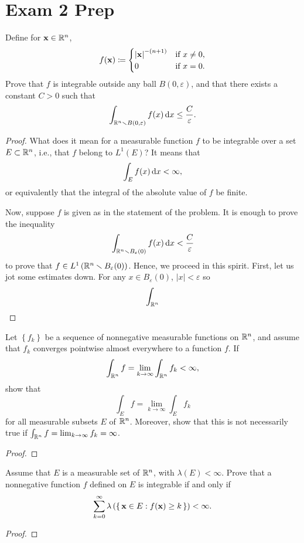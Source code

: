 \section{Exam 2 Prep}
\begin{problem}
Define for $\mathbf{x}\in\mathbb{R}^n$,
\[
f(\mathbf{x})\coloneqq
\begin{cases}
\left|\mathbf{x}\right|^{-(n+1)}&\text{if $x\neq 0$,}\\
0&\text{if $x=0$.}
\end{cases}
\]
Prove that $f$ is integrable outside any ball $B(0,\varepsilon)$, and that
there exists a constant $C>0$ such that
\[
\int_{\mathbb{R}^n\smallsetminus B(0,\varepsilon)}f(x)\mathop{}\!\mathrm{d} x\leq\frac{C}{\varepsilon}.
\]
\end{problem}
\begin{proof}
What does it mean for a measurable function $f$ to be integrable over a set
$E\subset\mathbb{R}^n$, i.e., that $f$ belong to $L^1(E)$? It means that
\[
\int_E f(x)\mathop{}\!\mathrm{d} x<\infty,
\]
or equivalently that the integral of the absolute value of $f$ be
finite.

Now, suppose $f$ is given as in the statement of the problem. It is enough
to prove the inequality
\begin{equation}
  \label{eq:given-inequality-1}
\int_{\mathbb{R}^n\smallsetminus B_\varepsilon(0)} f(x)\mathop{}\!\mathrm{d} x<\frac{C}{\varepsilon}
\end{equation}
to prove that $f\in L^1\left(\mathbb{R}^n\smallsetminus B_\varepsilon(0)\right)$. Hence,
we proceed in this spirit. First, let us jot some estimates down. For any
$x\in B_\varepsilon(0)$, $|x|<\varepsilon$ so
\[
\int_{\mathbb{R}^n}
\]
\end{proof}

\begin{problem}
Let $\left\{f_k\right\}$ be a sequence of nonnegative measurable functions
on $\mathbb{R}^n$, and assume that $f_k$ converges pointwise almost everywhere to
a function $f$. If
\[
\int_{\mathbb{R}^n} f=\lim_{k\to\infty}\int_{\mathbb{R}^n} f_k<\infty,
\]
show that
\[
\int_E f=\lim_{k\to\infty}\int_E f_k
\]
for all measurable subsets $E$ of $\mathbb{R}^n$. Moreover, show that this is not
necessarily true if $\int_{\mathbb{R}^n} f=\lim_{k\to\infty} f_k=\infty$.
\end{problem}
\begin{proof}
\end{proof}

\begin{problem}
Assume that $E$ is a measurable set of $\mathbb{R}^n$, with $\lambda(E)<\infty$. Prove
that a nonnegative function $f$ defined on $E$ is integrable if and only if
\[
\sum_{k=0}^\infty\lambda\left(\left\{\,\mathbf{x}\in E:f(\mathbf{x})\geq
    k\,\right\}\right)<\infty.
\]
\end{problem}
\begin{proof}
\end{proof}

